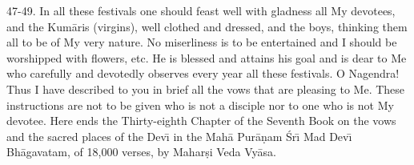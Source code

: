 47-49. In all these festivals one should feast well with gladness all My devotees, and the Kum\=aris (virgins), well clothed and dressed, and the boys, thinking them all to be of My very nature. No miserliness is to be entertained and I should be worshipped with flowers, etc. He is blessed and attains his goal and is dear to Me who carefully and devotedly observes every year all these festivals. O Nagendra! Thus I have described to you in brief all the vows that are pleasing to Me. These instructions are not to be given who is not a disciple nor to one who is not My devotee.
Here ends the Thirty-eighth Chapter of the Seventh Book on the vows and the sacred places of the Dev\={\i} in the Mah\=a Pur\=a\d{n}am \'Sr\={\i} Mad Dev\={\i} Bh\=agavatam, of 18,000 verses, by Mahar\d{s}i Veda Vy\=asa.



